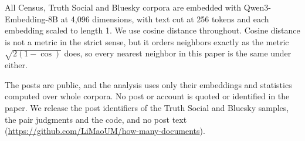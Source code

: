 All Census, Truth Social and Bluesky corpora are embedded with Qwen3-Embedding-8B at 4{,}096 dimensions, with text cut at 256 tokens and each embedding scaled to length 1. We use cosine distance throughout. Cosine distance is not a metric in the strict sense, but it orders neighbors exactly as the metric $\sqrt{2(1 - \cos)}$ does, so every nearest neighbor in this paper is the same under either.

The posts are public, and the analysis uses only their embeddings and statistics computed over whole corpora. No post or account is quoted or identified in the paper. We release the post identifiers of the Truth Social and Bluesky samples, the pair judgments and the code, and no post text\ifdefined\arxivversion{} (\url{https://github.com/LiMaoUM/how-many-documents})\fi.
